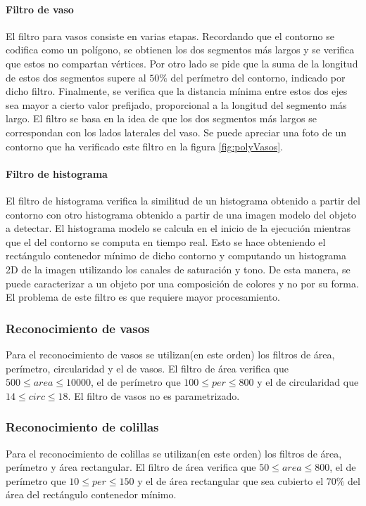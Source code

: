 	\paragraph{Filtro de vaso}
	El filtro para vasos consiste en varias etapas. Recordando que el contorno se codifica como un pol\'igono, se obtienen los dos segmentos 
	m\'as largos y se verifica que estos no compartan v\'ertices. Por otro lado se pide que la suma de la longitud de estos dos segmentos supere al $50\%$ del 
	per\'imetro del contorno, indicado por dicho filtro. Finalmente, se verifica que la distancia m\'inima entre estos dos ejes sea mayor a cierto valor prefijado, proporcional a la
	longitud del segmento m\'as largo. El filtro se basa en la idea de que 
	los dos segmentos m\'as largos se correspondan con los lados laterales 
	del vaso.  Se puede apreciar una foto  de un contorno que ha 
	verificado este filtro en la figura \ref{fig:polyVasos}. 
	\paragraph{Filtro de histograma}
	El filtro de histograma verifica la similitud de un histograma obtenido a partir del contorno con otro histograma obtenido a partir de 
	una imagen modelo del objeto a detectar. El histograma modelo se calcula en el inicio de la ejecuci\'on mientras que el del contorno se
	computa en tiempo real. Esto se hace obteniendo el rect\'angulo 
	contenedor m\'inimo de dicho contorno y computando un histograma 2D de la imagen
	utilizando los canales de saturaci\'on y tono. De esta manera, se 
	puede caracterizar a un objeto por una composici\'on de colores y no por su forma. El 
	problema de este filtro es que requiere mayor procesamiento.
	
	\subsubsection{Reconocimiento de vasos}
	Para el reconocimiento de vasos se utilizan(en este orden) los filtros de \'area, per\'imetro, circularidad y el de vasos.
	El filtro de \'area verifica que $500 \leq area \leq 10000 $, el de 
	per\'imetro que $100 \leq per \leq 800 $ y el de circularidad
	que $14 \leq circ \leq 18$. El filtro de vasos no es parametrizado. 
	
	\subsubsection{Reconocimiento de colillas}
	Para el reconocimiento de colillas se utilizan(en este orden) los filtros de \'area, per\'imetro y \'area rectangular.
	El filtro de \'area verifica que $50 \leq area \leq 800 $, el de per\'imetro que $10 \leq per \leq 150 $ y el de \'area rectangular
	que sea cubierto el $70\%$ del \'area del rect\'angulo contenedor m\'inimo.
	
